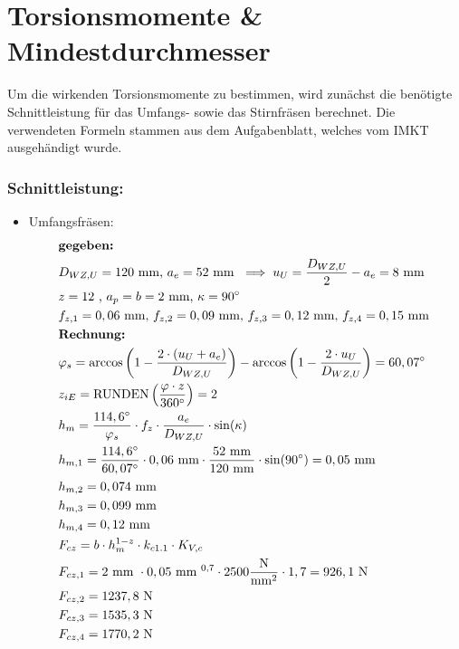 \section{Torsionsmomente \& Mindestdurchmesser}
Um die wirkenden Torsionsmomente zu bestimmen, wird zunächst die benötigte Schnittleistung für das Umfangs- sowie das Stirnfräsen berechnet. Die verwendeten Formeln stammen aus dem Aufgabenblatt, welches vom IMKT ausgehändigt wurde.
\subsubsection{Schnittleistung:}
\begin{itemize}
\item{Umfangsfräsen:}
\begin{align*}
	&\textbf{gegeben: } \\
	&D_{WZ,U} = 120 \text{ mm, } a_e = 52 \text{ mm } \implies u_{U} = \frac{D_{WZ,U}}{2} - a_e = 8 \text{ mm} \\
	&z= 12 \text{ , } a_p=b=2\text{ mm, }\kappa = 90^\circ \\
	&f_{z,1} = 0,06 \text{ mm, } f_{z,2} = 0,09 \text{ mm, } f_{z,3} = 0,12 \text{ mm, } f_{z,4} = 0,15 \text{ mm } \\
	&\textbf{Rechnung: } \\
	&\varphi_s = \arccos \left( 1-  \frac{2\x (u_{U} + a_e)}{D_{WZ,U}} \right) - \arccos \left( 1-  \frac{2\x u_{U}}{D_{WZ,U}} \right) = 60,07 ^\circ \\
	&z_{iE} = \text{RUNDEN}\left( \frac{\varphi \x z}{360 ^\circ} \right) = 2 \\
	&h_m = \frac{114,6 ^\circ}{\varphi_s} \x f_z \x \frac{a_e}{D_{WZ,U}} \x \sin (\kappa ) \\
	&h_{m,1} = \frac{114,6 ^\circ}{60,07 ^\circ} \x 0,06 \text{ mm} \x \frac{52\text{ mm}}{120 \text{ mm}} \x \sin (90 ^\circ )  =  0,05 \text{ mm} \\
	&h_{m,2} = 0,074 \text{ mm} \\
	&h_{m,3} = 0,099 \text{ mm} \\
	&h_{m,4} = 0,12 \text{ mm} \\
	&F_{cz} = b \x h_m ^{1-z} \x k_{c1.1} \x K_{V,c}\\
	&F_{cz,1} = 2 \text{ mm } \x 0,05 \text{ mm } ^{0,7}  \x 2500 \frac{\text{N}}{\text{mm} ^2} \x 1,7= 926,1 \text{ N} \\
	&F_{cz,2} = 1237,8 \text{ N} \\
	&F_{cz,3} = 1535,3 \text{ N} \\
	&F_{cz,4} = 1770,2 \text{ N} \\

\end{align*}
\end{itemize}
